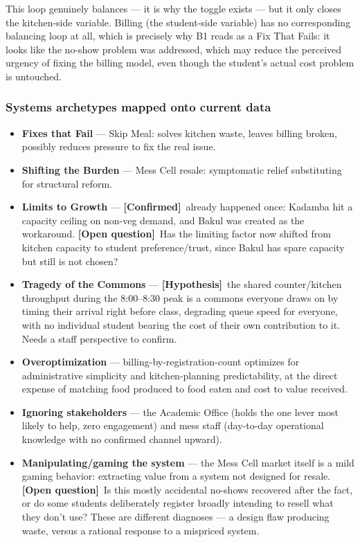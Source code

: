 \documentclass[11pt]{article}
\newcommand{\confirmed}{\textbf{[Confirmed]}}
\newcommand{\hypo}{\textbf{[Hypothesis]}}
\newcommand{\openq}{\textbf{[Open question]}}
\begin{document}
This loop genuinely balances --- it is why the toggle exists --- but it only closes
the kitchen-side variable. Billing (the student-side variable) has no corresponding
balancing loop at all, which is precisely why B1 reads as a Fix That Fails: it looks
like the no-show problem was addressed, which may reduce the perceived urgency of
fixing the billing model, even though the student's actual cost problem is untouched.

\subsubsection*{Systems archetypes mapped onto current data}

\begin{itemize}
    \item \textbf{Fixes that Fail} --- Skip Meal: solves kitchen waste, leaves
        billing broken, possibly reduces pressure to fix the real issue.
    \item \textbf{Shifting the Burden} --- Mess Cell resale: symptomatic relief
        substituting for structural reform.
    \item \textbf{Limits to Growth} --- \confirmed\ already happened once: Kadamba
        hit a capacity ceiling on non-veg demand, and Bakul was created as the
        workaround. \openq\ Has the limiting factor now shifted from kitchen
        capacity to student preference/trust, since Bakul has spare capacity but
        still is not chosen?
    \item \textbf{Tragedy of the Commons} --- \hypo\ the shared counter/kitchen
        throughput during the 8:00--8:30 peak is a commons everyone draws on by
        timing their arrival right before class, degrading queue speed for everyone,
        with no individual student bearing the cost of their own contribution to it.
        Needs a staff perspective to confirm.
    \item \textbf{Overoptimization} --- billing-by-registration-count optimizes for
        administrative simplicity and kitchen-planning predictability, at the direct
        expense of matching food produced to food eaten and cost to value received.
    \item \textbf{Ignoring stakeholders} --- the Academic Office (holds the one lever
        most likely to help, zero engagement) and mess staff (day-to-day operational
        knowledge with no confirmed channel upward).
    \item \textbf{Manipulating/gaming the system} --- the Mess Cell market itself is
        a mild gaming behavior: extracting value from a system not designed for
        resale. \openq\ Is this mostly accidental no-shows recovered after the fact,
        or do some students deliberately register broadly intending to resell what
        they don't use? These are different diagnoses --- a design flaw producing
        waste, versus a rational response to a mispriced system.
\end{itemize}
\end{document}
